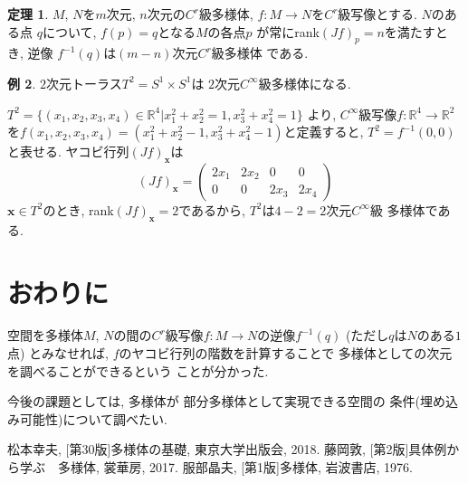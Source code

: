 \documentclass[twocolumn]{jarticle}
\theoremstyle{definition}
\newtheorem{theorem}{定理}[section]
\newtheorem{example}[theorem]{例}
\begin{document}
\begin{theorem}\label{theo:f^{-1}(q) C^r manifold}
  $M$, $N$を$m$次元, $n$次元の$C^r$級多様体, 
  $f:M\to N$を$C^r$級写像とする. $N$のある点
  $q$について, $f(p)=q$となる$M$の各点$p$
  が常にrank$(Jf)_p=n$を満たすとき, 逆像
  $f^{-1}(q)$は$(m-n)$次元$C^r$級多様体
  である. 
\end{theorem}

\begin{example}
  $2$次元トーラス$T^2=S^1\times S^1$は
  $2$次元$C^\infty$級多様体になる. 

  $T^2=\{(x_1,x_2,x_3,x_4)\in \mathbb{R}^4|
  x_1^2+x_2^2=1, x_3^2+x_4^2=1\}$
  より, 
  $C^\infty$級写像$f:\mathbb{R}^4\to \mathbb{R}^2$
  を$f(x_1,x_2,x_3,x_4)=(x_1^2+x_2^2-1,
  x_3^2+x_4^2-1)$と定義すると, 
  $T^2=f^{-1}(0,0)$
  と表せる. ヤコビ行列$(Jf)_{\boldsymbol{x}}$は
  $$(Jf)_{\boldsymbol{x}}=
      \left(\begin{array}{cccc}
          2x_1&2x_2&0&0\\
          0&0&2x_3&2x_4
      \end{array}\right)$$
  $\boldsymbol{x}\in T^2$のとき, 
  rank$(Jf)_{\boldsymbol{x}}=2$であるから, 
  $T^2$は$4-2=2$次元$C^\infty$級
  多様体である. 
\end{example}
\section{おわりに}
空間を多様体$M$, $N$の間の$C^r$級写像$f:M\to N$の逆像$f^{-1}(q)$
(ただし$q$は$N$のある$1$点)
とみなせれば, $f$のヤコビ行列の階数を計算することで
多様体としての次元を調べることができるという
ことが分かった. 

今後の課題としては, 多様体が
部分多様体として実現できる空間の
条件(埋め込み可能性)について調べたい. 
\begin{thebibliography}{99}
   松本幸夫, [第30版]多様体の基礎, 東京大学出版会, 2018.
   藤岡敦, [第2版]具体例から学ぶ　多様体, 裳華房, 2017.
   服部晶夫, [第1版]多様体, 岩波書店, 1976.
  \end{thebibliography}
\end{document}
